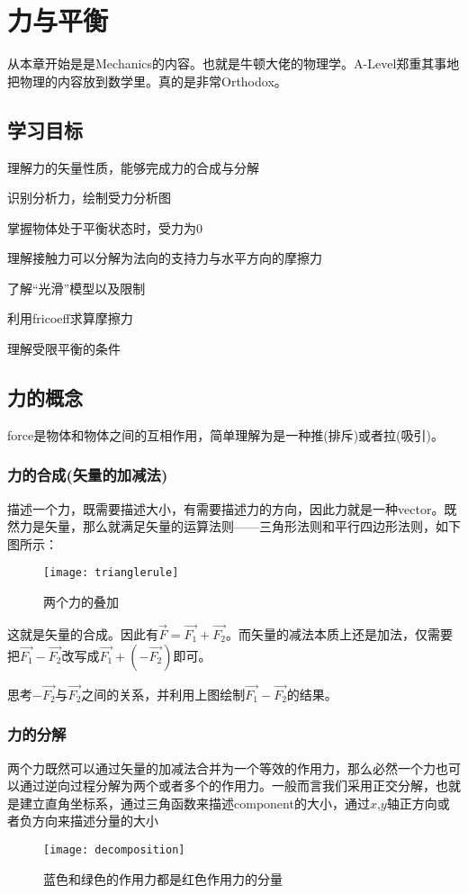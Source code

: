 \chapter{力与平衡}
\label{Forces and equilibrium}
从本章开始是是Mechanics的内容。也就是牛顿大佬的物理学。A-Level郑重其事地把物理的内容放到数学里。真的是非常Orthodox。

\section*{学习目标}
\begin{todolist}
	\item 理解力的矢量性质，能够完成力的合成与分解
	\item 识别分析力，绘制受力分析图
	\item 掌握物体处于平衡状态时，受力为$0$
	\item 理解接触力可以分解为法向的支持力与水平方向的摩擦力
	\item 了解``光滑''模型以及限制
	\item 利用\gls{fricoeff}求算摩擦力
	\item 理解受限平衡的条件
\end{todolist}
\clearpage

\section{力的概念}
\label{sec:Force Concept}
\gls{force}是物体和物体之间的互相作用，简单理解为是一种推(排斥)或者拉(吸引)。

\subsection*{力的合成(矢量的加减法)}
\label{subsec:addition rule}
描述一个力，既需要描述大小，有需要描述力的方向，因此力就是一种\gls{vector}。既然力是矢量，那么就满足矢量的运算法则——三角形法则和平行四边形法则，如下图所示：
\begin{figure}[H]
\centering
\texttt{[image: trianglerule]}
\caption{两个力的叠加}
\end{figure}
这就是矢量的合成。因此有$\vec{F}=\vec{F_1}+\vec{F_2}$。而矢量的减法本质上还是加法，仅需要把$\vec{F_1}-\vec{F_2}$改写成$\vec{F_1} + (-\vec{F_2})$即可。

\begin{TaskBox}
思考$-\vec{F_2}$与$\vec{F_2}$之间的关系，并利用上图绘制$\vec{F_1}-\vec{F_2}$的结果。
\end{TaskBox}

\subsection*{力的分解}
两个力既然可以通过矢量的加减法合并为一个等效的作用力，那么必然一个力也可以通过逆向过程分解为两个或者多个的作用力。一般而言我们采用正交分解，也就是建立直角坐标系，通过三角函数来描述\gls{component}的大小，通过$x$,$y$轴正方向或者负方向来描述分量的大小
\begin{figure}[H]
\centering
\texttt{[image: decomposition]}
\caption{蓝色和绿色的作用力都是红色作用力的分量}
\end{figure}

